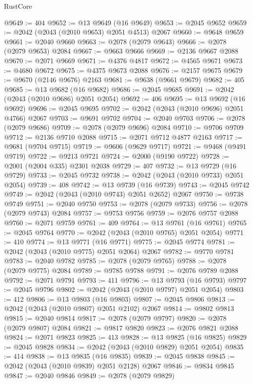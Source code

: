 \begin{lexlean}{RustCore}
\begin{coremodule}
@9649 := 404
@9652 := @13 @9649 (@16 @9649)
@9653 := @2045 @9652
@9659 := @2042 (@2043 (@2010 @9653) @2051 @4513) @2067
@9660 := @9648 @9659
@9661 := @2040 @9660
@9663 := @2078 (@2079 @9643)
@9666 := @2078 (@2079 @9653) @2084
@9667 := @9663 @9666
@9669 := @2136 @9667 @2088
@9670 := @2071 @9669
@9671 := @4376 @4817
@9672 := @4565 @9671
@9673 := @4680 @9672
@9675 := @4375 @9673 @2088
@9676 := @2157 @9675
@9679 := @9670 (@2146 @9676) @2163
@9681 := @9638 (@9661 @9679)
@9682 := 405
@9685 := @13 @9682 (@16 @9682)
@9686 := @2045 @9685
@9691 := @2042 (@2043 (@2010 @9686) @2051 @2054)
@9692 := 406
@9695 := @13 @9692 (@16 @9692)
@9696 := @2045 @9695
@9702 := @2042 (@2043 (@2010 @9696) @2051 @4766) @2067
@9703 := @9691 @9702
@9704 := @2040 @9703
@9706 := @2078 (@2079 @9686)
@9709 := @2078 (@2079 @9696) @2084
@9710 := @9706 @9709
@9712 := @2136 @9710 @2088
@9715 := @2071 @9712 @4877 @2163
@9717 := @9681 (@9704 @9715)
@9719 := @9606 (@9629 @9717)
@9721 := @9468 (@9491 @9719)
@9722 := @9213 @9721
@9724 := @2000 (@9190 @9722)
@9728 := @2001 (@2004 @335) @2301 @2038
@9729 := 407
@9732 := @13 @9729 (@16 @9729)
@9733 := @2045 @9732
@9738 := @2042 (@2043 (@2010 @9733) @2051 @2054)
@9739 := 408
@9742 := @13 @9739 (@16 @9739)
@9743 := @2045 @9742
@9749 := @2042 (@2043 (@2010 @9743) @2051 @2652) @2067
@9750 := @9738 @9749
@9751 := @2040 @9750
@9753 := @2078 (@2079 @9733)
@9756 := @2078 (@2079 @9743) @2084
@9757 := @9753 @9756
@9759 := @2076 @9757 @2088
@9760 := @2071 @9759
@9761 := 409
@9764 := @13 @9761 (@16 @9761)
@9765 := @2045 @9764
@9770 := @2042 (@2043 (@2010 @9765) @2051 @2054)
@9771 := 410
@9774 := @13 @9771 (@16 @9771)
@9775 := @2045 @9774
@9781 := @2042 (@2043 (@2010 @9775) @2051 @2064) @2067
@9782 := @9770 @9781
@9783 := @2040 @9782
@9785 := @2078 (@2079 @9765)
@9788 := @2078 (@2079 @9775) @2084
@9789 := @9785 @9788
@9791 := @2076 @9789 @2088
@9792 := @2071 @9791
@9793 := 411
@9796 := @13 @9793 (@16 @9793)
@9797 := @2045 @9796
@9802 := @2042 (@2043 (@2010 @9797) @2051 @2054)
@9803 := 412
@9806 := @13 @9803 (@16 @9803)
@9807 := @2045 @9806
@9813 := @2042 (@2043 (@2010 @9807) @2051 @2102) @2067
@9814 := @9802 @9813
@9815 := @2040 @9814
@9817 := @2078 (@2079 @9797)
@9820 := @2078 (@2079 @9807) @2084
@9821 := @9817 @9820
@9823 := @2076 @9821 @2088
@9824 := @2071 @9823
@9825 := 413
@9828 := @13 @9825 (@16 @9825)
@9829 := @2045 @9828
@9834 := @2042 (@2043 (@2010 @9829) @2051 @2054)
@9835 := 414
@9838 := @13 @9835 (@16 @9835)
@9839 := @2045 @9838
@9845 := @2042 (@2043 (@2010 @9839) @2051 @2128) @2067
@9846 := @9834 @9845
@9847 := @2040 @9846
@9849 := @2078 (@2079 @9829)

\end{coremodule}
\end{lexlean}
